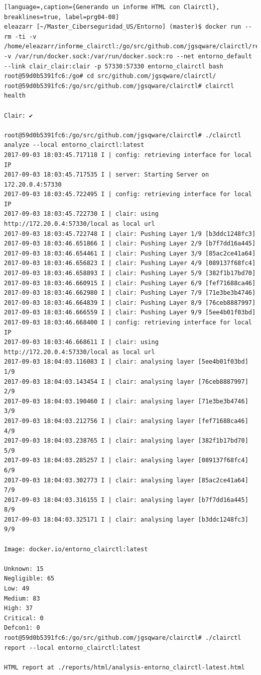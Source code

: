 \begin{lstlisting}[language=,caption={Generando un informe HTML con Clairctl}, breaklines=true, label=prg04-08]
eleazarr [~/Master_Ciberseguridad_US/Entorno] (master)$ docker run --rm -ti -v /home/eleazarr/informe_clairctl:/go/src/github.com/jgsqware/clairctl/reports -v /var/run/docker.sock:/var/run/docker.sock:ro --net entorno_default --link clair_clair:clair -p 57330:57330 entorno_clairctl bash
root@59d0b5391fc6:/go# cd src/github.com/jgsqware/clairctl/
root@59d0b5391fc6:/go/src/github.com/jgsqware/clairctl# clairctl health

Clair: ✔

root@59d0b5391fc6:/go/src/github.com/jgsqware/clairctl# ./clairctl analyze --local entorno_clairctl:latest
2017-09-03 18:03:45.717118 I | config: retrieving interface for local IP
2017-09-03 18:03:45.717535 I | server: Starting Server on 172.20.0.4:57330
2017-09-03 18:03:45.722495 I | config: retrieving interface for local IP
2017-09-03 18:03:45.722730 I | clair: using http://172.20.0.4:57330/local as local url
2017-09-03 18:03:45.722748 I | clair: Pushing Layer 1/9 [b3ddc1248fc3]
2017-09-03 18:03:46.651866 I | clair: Pushing Layer 2/9 [b7f7dd16a445]
2017-09-03 18:03:46.654461 I | clair: Pushing Layer 3/9 [85ac2ce41a64]
2017-09-03 18:03:46.656823 I | clair: Pushing Layer 4/9 [089137f68fc4]
2017-09-03 18:03:46.658893 I | clair: Pushing Layer 5/9 [382f1b17bd70]
2017-09-03 18:03:46.660915 I | clair: Pushing Layer 6/9 [fef71688ca46]
2017-09-03 18:03:46.662980 I | clair: Pushing Layer 7/9 [71e3be3b4746]
2017-09-03 18:03:46.664839 I | clair: Pushing Layer 8/9 [76ceb8887997]
2017-09-03 18:03:46.666559 I | clair: Pushing Layer 9/9 [5ee4b01f03bd]
2017-09-03 18:03:46.668400 I | config: retrieving interface for local IP
2017-09-03 18:03:46.668611 I | clair: using http://172.20.0.4:57330/local as local url
2017-09-03 18:04:03.116083 I | clair: analysing layer [5ee4b01f03bd] 1/9
2017-09-03 18:04:03.143454 I | clair: analysing layer [76ceb8887997] 2/9
2017-09-03 18:04:03.190460 I | clair: analysing layer [71e3be3b4746] 3/9
2017-09-03 18:04:03.212756 I | clair: analysing layer [fef71688ca46] 4/9
2017-09-03 18:04:03.238765 I | clair: analysing layer [382f1b17bd70] 5/9
2017-09-03 18:04:03.285257 I | clair: analysing layer [089137f68fc4] 6/9
2017-09-03 18:04:03.302773 I | clair: analysing layer [85ac2ce41a64] 7/9
2017-09-03 18:04:03.316155 I | clair: analysing layer [b7f7dd16a445] 8/9
2017-09-03 18:04:03.325171 I | clair: analysing layer [b3ddc1248fc3] 9/9

Image: docker.io/entorno_clairctl:latest

Unknown: 15
Negligible: 65
Low: 49
Medium: 83
High: 37
Critical: 0
Defcon1: 0
root@59d0b5391fc6:/go/src/github.com/jgsqware/clairctl# ./clairctl report --local entorno_clairctl:latest                  

HTML report at ./reports/html/analysis-entorno_clairctl-latest.html
\end{lstlisting}

